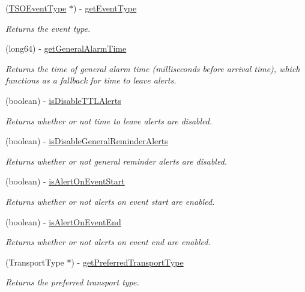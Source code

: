 \begin{DoxyCompactItemize}
(\hyperlink{interface_t_s_o_event_type}{T\+S\+O\+Event\+Type} $\ast$) -\/ \hyperlink{protocol_i_event-p_add6cde14025f53b895a590abb48691fa}{get\+Event\+Type}
\begin{DoxyCompactList}\small\item\em Returns the event type. \end{DoxyCompactList}\item 
(long64) -\/ \hyperlink{protocol_i_event-p_af2343abfbba77c3bb85722c5162e6d81}{get\+General\+Alarm\+Time}
\begin{DoxyCompactList}\small\item\em Returns the time of general alarm time (milliseconds before arrival time), which functions as a fallback for time to leave alerts. \end{DoxyCompactList}\item 
(boolean) -\/ \hyperlink{protocol_i_event-p_a43115de987812e8481ec14cb8b908b96}{is\+Disable\+T\+T\+L\+Alerts}
\begin{DoxyCompactList}\small\item\em Returns whether or not time to leave alerts are disabled. \end{DoxyCompactList}\item 
(boolean) -\/ \hyperlink{protocol_i_event-p_a4aa248f17b9ba5eb195c5af99923ee62}{is\+Disable\+General\+Reminder\+Alerts}
\begin{DoxyCompactList}\small\item\em Returns whether or not general reminder alerts are disabled. \end{DoxyCompactList}\item 
(boolean) -\/ \hyperlink{protocol_i_event-p_afdd594ac0c983b204aa8550e3c7dfb10}{is\+Alert\+On\+Event\+Start}
\begin{DoxyCompactList}\small\item\em Returns whether or not alerts on event start are enabled. \end{DoxyCompactList}\item 
(boolean) -\/ \hyperlink{protocol_i_event-p_aa531d6d732db162f2afb45b0a9094fa5}{is\+Alert\+On\+Event\+End}
\begin{DoxyCompactList}\small\item\em Returns whether or not alerts on event end are enabled. \end{DoxyCompactList}\item 
(Transport\+Type $\ast$) -\/ \hyperlink{protocol_i_event-p_aba19a7534c8ebeea01f8b3ca714f7e4a}{get\+Preferred\+Transport\+Type}
\begin{DoxyCompactList}\small\item\em Returns the preferred transport type. \end{DoxyCompactList}\end{DoxyCompactItemize}


